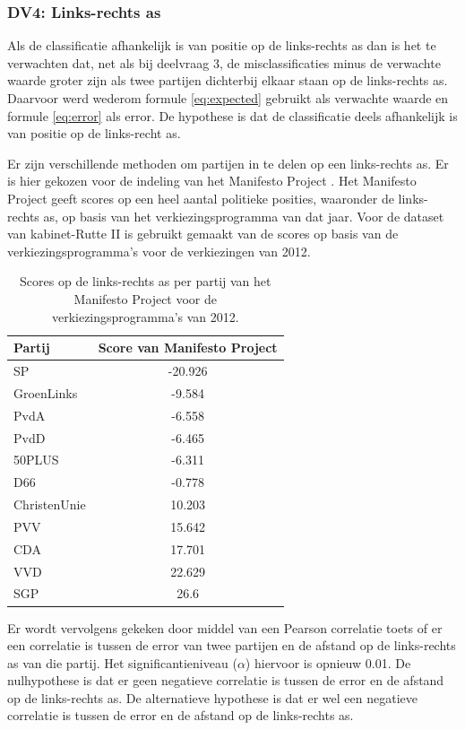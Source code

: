 \subsubsection{DV4: Links-rechts as}
Als de classificatie afhankelijk is van positie op de links-rechts as dan is het te verwachten dat, net als bij deelvraag 3, de misclassificaties minus de verwachte waarde groter zijn als twee partijen dichterbij elkaar staan op de links-rechts as.  Daarvoor werd wederom formule \ref{eq:expected} gebruikt als verwachte waarde en formule \ref{eq:error} als error. De hypothese is dat de classificatie deels afhankelijk is van positie op de links-recht as.\par
Er zijn verschillende methoden om partijen in te delen op een links-rechts as. Er is hier gekozen voor de indeling van het Manifesto Project \cite{Volkens:2017}. Het Manifesto Project geeft scores op een heel aantal politieke posities, waaronder de links-rechts as, op basis van het verkiezingsprogramma van dat jaar. Voor de dataset van kabinet-Rutte II is gebruikt gemaakt van de scores op basis van de verkiezingsprogramma's voor de verkiezingen van 2012. \par
\begin{table}[H]
\centering
\caption{Scores op de links-rechts as per partij van het Manifesto Project voor de verkiezingsprogramma's van 2012.}
\label{my-label}
\centering
\begin{tabular}{lc}
\toprule
Partij  & Score van Manifesto Project \\
\midrule
SP           & -20.926 \\ 
GroenLinks   & -9.584 \\ 
PvdA         & -6.558 \\ 
PvdD         & -6.465 \\ 
50PLUS       & -6.311\\ 
D66          & -0.778\\ 
ChristenUnie & 10.203\\ 
PVV          & 15.642\\ 
CDA          & 17.701\\
VVD          & 22.629\\ 
SGP          & 26.6\\ 
\bottomrule
\end{tabular}
\end{table}
Er wordt vervolgens gekeken door middel van een Pearson correlatie toets of er een correlatie is tussen de error van twee partijen en de afstand op de links-rechts as van die partij. Het significantieniveau ($\alpha$) hiervoor is opnieuw 0.01. De nulhypothese is dat er geen negatieve correlatie is tussen de error en de afstand op de links-rechts as. De alternatieve hypothese is dat er wel een negatieve correlatie is tussen de error en de afstand op de links-rechts as.\par
